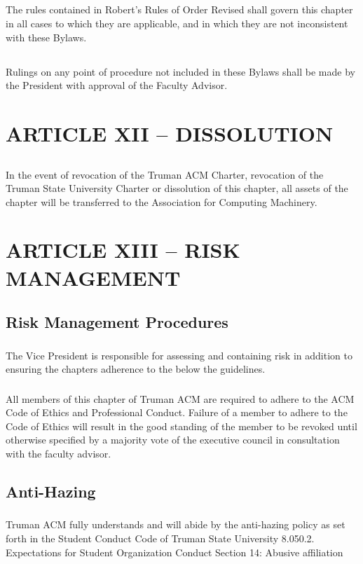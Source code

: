 \documentclass[12pt]{article}
\begin{document}
\subsection{}	The rules contained in Robert's Rules of Order Revised shall govern this chapter in all cases to which they are applicable, and in which they are not inconsistent with these Bylaws.
\subsection{}	Rulings on any point of procedure  not included in these Bylaws shall be made by the President with approval of the Faculty Advisor.

\section{ARTICLE XII – DISSOLUTION}
\subsection{}	In the event of revocation of the Truman ACM Charter, revocation of the Truman State University Charter or dissolution of this chapter, all assets of the chapter will be transferred to the Association for Computing Machinery.

\section{ARTICLE XIII – RISK MANAGEMENT}
\subsection{Risk Management Procedures}
\subsubsection{}	The Vice President is responsible for assessing and containing risk in addition to ensuring the chapters adherence to the below the guidelines.
\subsubsection{}	All members of this chapter of Truman ACM are required to adhere to the ACM Code of Ethics and Professional Conduct. Failure of a member to adhere to the Code of Ethics will result in the good standing of the member to be revoked until otherwise specified by a majority vote of the executive council in consultation with the faculty advisor.
\subsection{Anti-Hazing}
\subsubsection{}	Truman ACM fully understands and will abide by the anti-hazing policy as set forth in the Student Conduct Code of Truman State University 8.050.2. Expectations for Student Organization Conduct Section 14: Abusive affiliation
	
\end{document}
